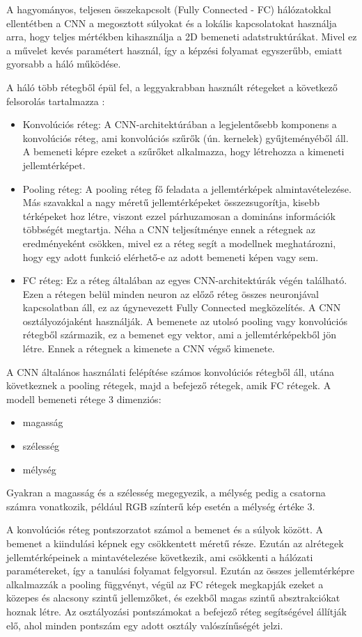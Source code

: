 A hagyományos, teljesen összekapcsolt (Fully Connected - FC) hálózatokkal ellentétben a CNN a megosztott súlyokat és a lokális kapcsolatokat használja arra, hogy teljes mértékben kihasználja a 2D bemeneti adatstruktúrákat. Mivel ez a művelet kevés paramétert használ, így a képzési folyamat egyszerűbb, emiatt gyorsabb a háló működése.\cite{cnn}

A háló több rétegből épül fel, a leggyakrabban használt rétegeket a következő felsorolás tartalmazza \cite{cnn}:
\begin{itemize}
\item Konvolúciós réteg: A CNN-architektúrában a legjelentősebb komponens a konvolúciós réteg, ami konvolúciós szűrők (ún. kernelek) gyűjteményéből áll. A bemeneti képre ezeket a szűrőket alkalmazza, hogy létrehozza a kimeneti jellemtérképet.
\item Pooling réteg: A pooling réteg fő feladata a jellemtérképek almintavételezése. Más szavakkal a nagy méretű jellemtérképeket összezsugorítja, kisebb térképeket hoz létre, viszont ezzel párhuzamosan a domináns információk többségét megtartja. Néha a CNN teljesítménye ennek a rétegnek az eredményeként csökken, mivel ez a réteg segít a modellnek meghatározni, hogy egy adott funkció elérhető-e az adott bemeneti képen vagy sem.
\item FC réteg: Ez a réteg általában az egyes CNN-architektúrák végén található. Ezen a rétegen belül minden neuron az előző réteg összes neuronjával kapcsolatban áll, ez az úgynevezett Fully Connected megközelítés. A CNN osztályozójaként használják. A bemenete az utolsó pooling vagy konvolúciós rétegből származik, ez a bemenet egy vektor, ami a jellemtérképekből jön létre. Ennek a rétegnek a kimenete a CNN végső kimenete.
\end{itemize}

A CNN általános használati felépítése számos konvolúciós rétegből áll, utána következnek a pooling rétegek, majd a befejező rétegek, amik FC rétegek. A modell bemeneti rétege 3 dimenziós:
\begin{itemize}
\item magasság
\item szélesség
\item mélység
\end{itemize}
Gyakran a magasság és a szélesség megegyezik, a mélység pedig a csatorna számra vonatkozik, például RGB színterű kép esetén a mélység értéke 3.

A konvolúciós réteg pontszorzatot számol a bemenet és a súlyok között. A bemenet a kiindulási képnek egy csökkentett méretű része. Ezután az alrétegek jellemtérképeinek a mintavételezése következik, ami csökkenti a hálózati paramétereket, így a tanulási folyamat felgyorsul. Ezután az összes jellemtérképre alkalmazzák a pooling függvényt, végül az FC rétegek megkapják ezeket a közepes és alacsony szintű jellemzőket, és ezekből magas szintű absztrakciókat hoznak létre. Az osztályozási pontszámokat a befejező réteg segítségével állítják elő, ahol minden pontszám egy adott osztály valószínűségét jelzi. \cite{cnn}

